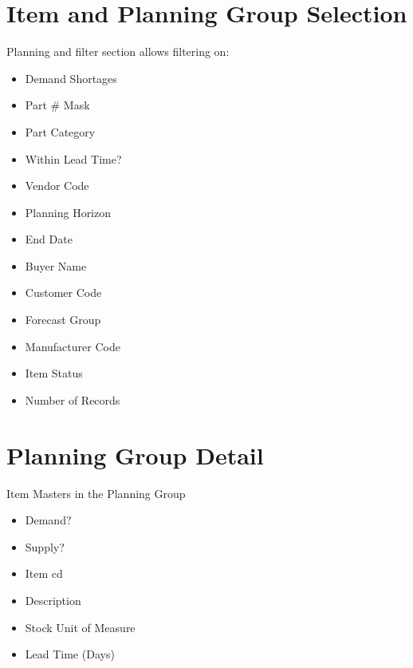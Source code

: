 \documentclass[letterpaper,10pt,english]{sphinxmanual}
\begin{document}
\section{Item and Planning Group Selection}
\label{\detokenize{index:item-and-planning-group-selection}}
Planning and filter section allows filtering on:
\begin{itemize}
\item {} 
Demand Shortages

\item {} 
Part \# Mask

\item {} 
Part Category

\item {} 
Within Lead Time?

\item {} 
Vendor Code

\item {} 
Planning Horizon

\item {} 
End Date

\item {} 
Buyer Name

\item {} 
Customer Code

\item {} 
Forecast Group

\item {} 
Manufacturer Code

\item {} 
Item Status

\item {} 
Number of Records

\end{itemize}


\section{Planning Group Detail}
\label{\detokenize{index:planning-group-detail}}
Item Masters in the Planning Group
\begin{itemize}
\item {} 
Demand?

\item {} 
Supply?

\item {} 
Item cd

\item {} 
Description

\item {} 
Stock Unit of Measure

\item {} 
Lead Time (Days)

\end{itemize}
\end{document}
